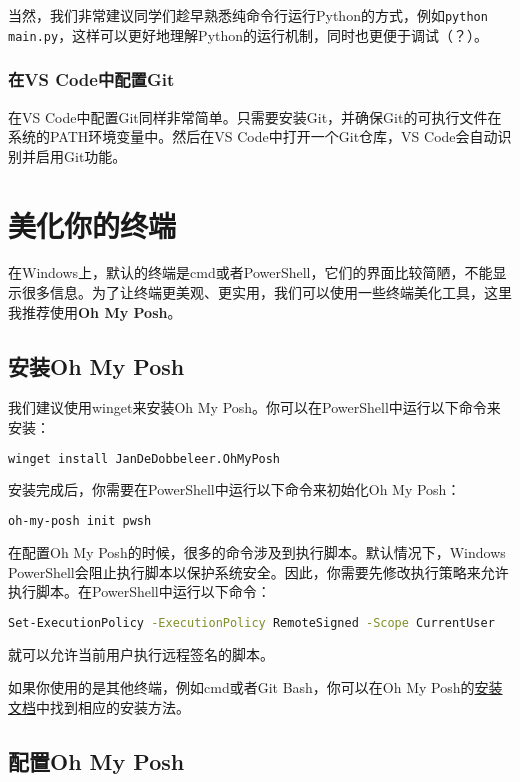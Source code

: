 \documentclass[../main.tex]{subfiles}
\begin{document}
当然，我们非常建议同学们趁早熟悉纯命令行运行Python的方式，例如\texttt{python main.py}，这样可以更好地理解Python的运行机制，同时也更便于调试（？）。

\subsubsection{在VS Code中配置Git}

在VS Code中配置Git同样非常简单。只需要安装Git，并确保Git的可执行文件在系统的PATH环境变量中。然后在VS Code中打开一个Git仓库，VS Code会自动识别并启用Git功能。

\section{美化你的终端}

在Windows上，默认的终端是cmd或者PowerShell，它们的界面比较简陋，不能显示很多信息。为了让终端更美观、更实用，我们可以使用一些终端美化工具，这里我推荐使用\textbf{Oh My Posh}。

\subsection{安装Oh My Posh}

我们建议使用winget来安装Oh My Posh。你可以在PowerShell中运行以下命令来安装：

\begin{lstlisting}[language=bash]
  winget install JanDeDobbeleer.OhMyPosh
\end{lstlisting}

安装完成后，你需要在PowerShell中运行以下命令来初始化Oh My Posh：
\begin{lstlisting}[language=bash]
  oh-my-posh init pwsh
\end{lstlisting}

在配置Oh My Posh的时候，很多的命令涉及到执行脚本。默认情况下，Windows PowerShell会阻止执行脚本以保护系统安全。因此，你需要先修改执行策略来允许执行脚本。在PowerShell中运行以下命令：
\begin{lstlisting}[language=bash]
  Set-ExecutionPolicy -ExecutionPolicy RemoteSigned -Scope CurrentUser
\end{lstlisting}
就可以允许当前用户执行远程签名的脚本。

如果你使用的是其他终端，例如cmd或者Git Bash，你可以在Oh My Posh的\href{https://ohmyposh.dev/docs/installation}{安装文档}中找到相应的安装方法。

\subsection{配置Oh My Posh}
\end{document}
